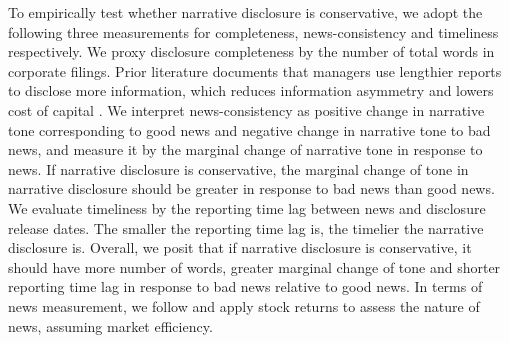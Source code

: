 \documentclass[a4paper]{article}
\begin{document}
\begin{spacing}{2}
To empirically test whether narrative disclosure is conservative, we adopt the following three measurements for completeness, news-consistency and timeliness respectively. We proxy disclosure completeness by the number of total words in corporate filings. Prior literature documents that managers use lengthier reports to disclose more information, which reduces information asymmetry and lowers cost of capital \citep*{leuzDisclosureCostCapital2009}. We interpret news-consistency as positive change in narrative tone corresponding to good news and negative change in narrative tone to bad news, and measure it by the marginal change of narrative tone in response to news. If narrative disclosure is conservative, the marginal change of tone in narrative disclosure should be greater in response to bad news than good news. We evaluate timeliness by the reporting time lag between news and disclosure release dates. The smaller the reporting time lag is, the timelier the narrative disclosure is. Overall, we posit that if narrative disclosure is conservative, it should have more number of words, greater marginal change of tone and shorter reporting time lag in response to bad news relative to good news. In terms of news measurement, we follow \citet{basuConservatismPrincipleAsymmetric1997} and apply stock returns to assess the nature of news, assuming market efficiency.


\end{spacing}
\end{document}

